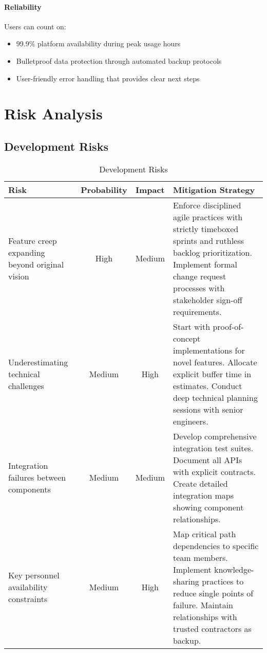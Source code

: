 \documentclass[12pt,a4paper]{article}
\begin{document}
\paragraph{Reliability}
Users can count on:
\begin{itemize}
    \item 99.9\% platform availability during peak usage hours
    \item Bulletproof data protection through automated backup protocols
    \item User-friendly error handling that provides clear next steps
\end{itemize}

\section{Risk Analysis}

\subsection{Development Risks}

\begin{table}[h]
\begin{tabularx}{\textwidth}{|X|c|c|X|}
\hline
\textbf{Risk} & \textbf{Probability} & \textbf{Impact} & \textbf{Mitigation Strategy} \\
\hline
Feature creep expanding beyond original vision & High & Medium & Enforce disciplined agile practices with strictly timeboxed sprints and ruthless backlog prioritization. Implement formal change request processes with stakeholder sign-off requirements. \\
\hline
Underestimating technical challenges & Medium & High & Start with proof-of-concept implementations for novel features. Allocate explicit buffer time in estimates. Conduct deep technical planning sessions with senior engineers. \\
\hline
Integration failures between components & Medium & Medium & Develop comprehensive integration test suites. Document all APIs with explicit contracts. Create detailed integration maps showing component relationships. \\
\hline
Key personnel availability constraints & Medium & High & Map critical path dependencies to specific team members. Implement knowledge-sharing practices to reduce single points of failure. Maintain relationships with trusted contractors as backup. \\
\hline
\end{tabularx}
\caption{Development Risks}
\end{table}
\end{document}
